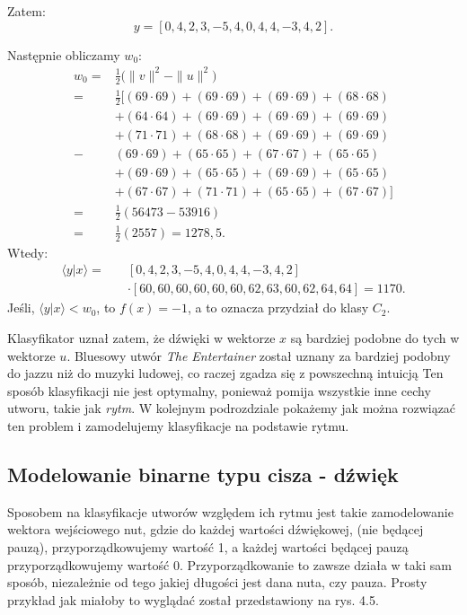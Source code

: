 Zatem:
\begin{equation*}
y =  [0, 4, 2, 3, -5, 4, 0, 4, 4, -3, 4, 2].
\end{equation*}

Następnie obliczamy $w_{0}$:
\begin{align*}
w_{0} = &  \frac{1}{2} \big(\|v\|^{2} - \|u\|^{2}\big)  \\
= & \frac{1}{2}[(69 \cdot 69) + (69 \cdot 69) + (69 \cdot 69) + (68 \cdot 68) \\
 & + (64 \cdot 64) + (69 \cdot 69) + (69 \cdot 69) + (69 \cdot 69) \\
 & + (71 \cdot 71) + (68 \cdot 68)  + (69 \cdot 69) + (69 \cdot 69) \\
 - & (69 \cdot 69) + (65 \cdot 65) + (67 \cdot 67) + (65 \cdot 65) \\
 & + (69 \cdot 69) + (65 \cdot 65) + (69 \cdot 69) + (65 \cdot 65) \\
 & + (67 \cdot 67) + (71 \cdot 71) + (65 \cdot 65) + (67 \cdot 67)] \\
 = & \frac{1}{2}(56473 - 53916) \\
 = & \frac{1}{2}(2557) = 1278,5.
\end{align*}
Wtedy:
\begin{align*}
\big \langle y|x  \big \rangle  = \quad 
& [0, 4, 2, 3, -5, 4, 0, 4, 4, -3, 4, 2] \\ 
&\cdot
[60,60,60,60,60,60,62,63,60,62,64,64] 
= 1170.
\end{align*}
Jeśli, $\big \langle y|x \big \rangle < w_{0}$, to $f(x) = -1$, a to oznacza przydział do klasy $C_{2}$.

Klasyfikator uznał zatem, że dźwięki w wektorze $x$ są bardziej podobne do tych w wektorze $u$. Bluesowy utwór \textit{The Entertainer} został uznany za bardziej podobny do jazzu niż do muzyki ludowej, co raczej zgadza się z powszechną intuicją Ten sposób klasyfikacji nie jest optymalny, ponieważ pomija wszystkie inne cechy utworu, takie jak \textit{rytm}. W kolejnym podrozdziale pokażemy jak można rozwiązać ten problem i zamodelujemy klasyfikacje na podstawie rytmu.

\subsection{Modelowanie binarne typu cisza - dźwięk}

Sposobem na klasyfikacje utworów względem ich rytmu jest takie zamodelowanie wektora wejściowego nut, gdzie do każdej wartości dźwiękowej, (nie będącej pauzą), przyporządkowujemy wartość 1, a każdej wartości będącej pauzą przyporządkowujemy wartość 0. Przyporządkowanie to zawsze działa w taki sam sposób, niezależnie od tego jakiej długości jest dana nuta, czy pauza. Prosty przykład jak miałoby to wyglądać został przedstawiony na rys. 4.5.

